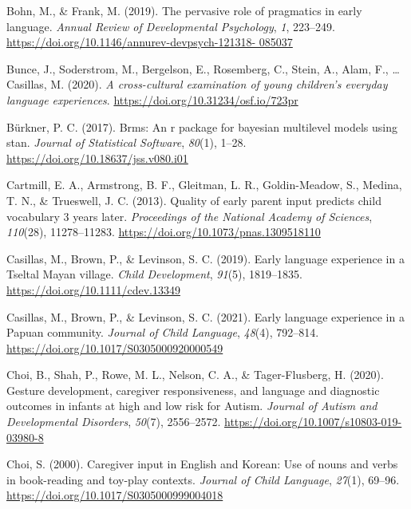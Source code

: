 \documentclass[
  man,mask,floatsintext]{apa6}
\newlength{\cslhangindent}
\newlength{\cslentryspacingunit} %
\newenvironment{CSLReferences}[2] %
 {%
  \setlength{\parindent}{0pt}
  \ifodd #1
  \let\oldpar\par
  \def\par{\hangindent=\cslhangindent\oldpar}
  \fi
  \setlength{\parskip}{#2\cslentryspacingunit}
 }%
 {}
\begin{document}
\begin{CSLReferences}{1}{0}
\leavevmode{}%
Bohn, M., \& Frank, M. (2019). The pervasive role of pragmatics in early language. \emph{Annual Review of Developmental Psychology}, \emph{1}, 223--249. \href{https://doi.org/10.1146/annurev-devpsych-121318-\%20085037}{https://doi.org/10.1146/annurev-devpsych-121318- 085037}

\leavevmode{}%
Bunce, J., Soderstrom, M., Bergelson, E., Rosemberg, C., Stein, A., Alam, F., \ldots{} Casillas, M. (2020). \emph{A cross-cultural examination of young children's everyday language experiences}. \url{https://doi.org/10.31234/osf.io/723pr}

\leavevmode{}%
Bürkner, P. C. (2017). Brms: {An} r package for bayesian multilevel models using stan. \emph{Journal of Statistical Software}, \emph{80}(1), 1--28. \url{https://doi.org/10.18637/jss.v080.i01}

\leavevmode{}%
Cartmill, E. A., Armstrong, B. F., Gleitman, L. R., Goldin-Meadow, S., Medina, T. N., \& Trueswell, J. C. (2013). Quality of early parent input predicts child vocabulary 3 years later. \emph{Proceedings of the National Academy of Sciences}, \emph{110}(28), 11278--11283. \url{https://doi.org/10.1073/pnas.1309518110}

\leavevmode{}%
Casillas, M., Brown, P., \& Levinson, S. C. (2019). Early language experience in a {Tseltal} {Mayan} village. \emph{Child Development}, \emph{91}(5), 1819--1835. \url{https://doi.org/10.1111/cdev.13349}

\leavevmode{}%
Casillas, M., Brown, P., \& Levinson, S. C. (2021). Early language experience in a {Papuan} community. \emph{Journal of Child Language}, \emph{48}(4), 792--814. \url{https://doi.org/10.1017/S0305000920000549}

\leavevmode{}%
Choi, B., Shah, P., Rowe, M. L., Nelson, C. A., \& Tager-Flusberg, H. (2020). Gesture development, caregiver responsiveness, and language and diagnostic outcomes in infants at high and low risk for {Autism}. \emph{Journal of Autism and Developmental Disorders}, \emph{50}(7), 2556--2572. \url{https://doi.org/10.1007/s10803-019-03980-8}

\leavevmode{}%
Choi, S. (2000). Caregiver input in {English} and {Korean}: Use of nouns and verbs in book-reading and toy-play contexts. \emph{Journal of Child Language}, \emph{27}(1), 69--96. \url{https://doi.org/10.1017/S0305000999004018}


\end{CSLReferences}
\end{document}
